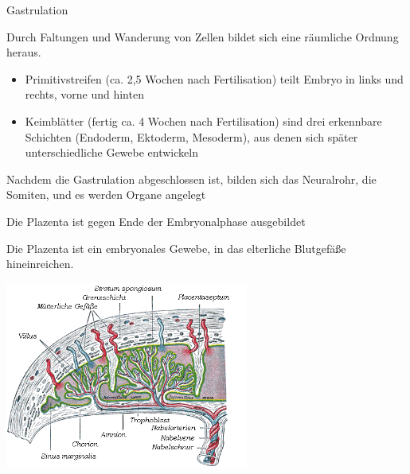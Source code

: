 \documentclass{beamer}
\begin{document}
\begin{frame}{Gastrulation}

Durch Faltungen und Wanderung von Zellen bildet sich eine räumliche Ordnung heraus.
 
\begin{itemize}
    \item 
    Primitivstreifen (ca. 2,5 Wochen nach Fertilisation) teilt Embryo in links und rechts, vorne und hinten
    \item
    Keimblätter (fertig ca. 4 Wochen nach Fertilisation) sind drei erkennbare Schichten (Endoderm, Ektoderm, Mesoderm), aus denen sich später unterschiedliche Gewebe entwickeln
\end{itemize}

Nachdem die Gastrulation abgeschlossen ist, bilden sich das Neuralrohr, die Somiten, und es werden Organe angelegt
    
\end{frame}

\begin{frame}{Die Plazenta ist gegen Ende der Embryonalphase ausgebildet}

Die Plazenta ist ein embryonales Gewebe, in das elterliche Blutgefäße hineinreichen. 

\begin{center}
\includegraphics[width=0.6\textwidth]{Plazenta.png}
    
\end{center}


    
\end{frame}
\end{document}
